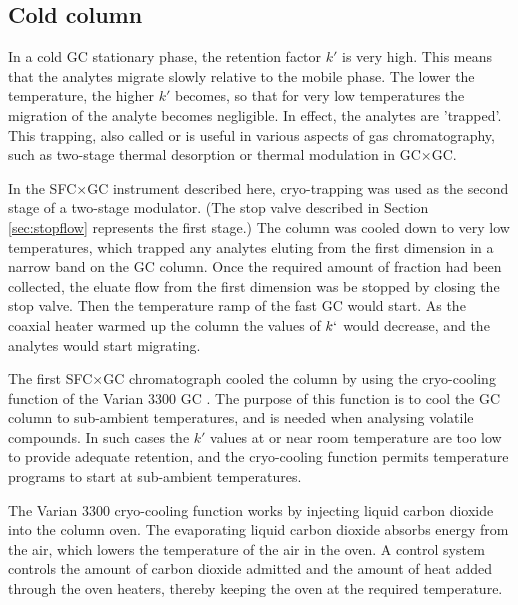 \subsection{Cold column}
\label{sec:ColdColumn}

In a cold GC stationary phase, the retention factor \(k'\) is very high. This
means that the analytes migrate slowly relative to the mobile phase. The lower
the temperature, the higher \(k'\) becomes, so that for very low temperatures
the migration of the analyte becomes negligible. In effect, the analytes are
'trapped'. This trapping, also called  or
 is useful in various aspects of gas chromatography, such
as two-stage thermal desorption or thermal modulation in GC×GC. 


In the SFC×GC instrument described here, cryo-trapping was used as the second
stage of a two-stage modulator. (The stop valve described in Section
\ref{sec:stopflow} represents the first stage.) The column was cooled down to
very low temperatures, which trapped any analytes eluting from the first
dimension in a narrow band on the GC column. Once the required amount of
fraction had been collected, the eluate flow from the first dimension was be
stopped by closing the stop valve. Then the temperature ramp of the fast GC
would start. As the coaxial heater warmed up the column the values of \(k`\)
would decrease, and the analytes would start migrating.

The first SFC×GC chromatograph cooled the column by using the cryo-cooling
function of the Varian 3300 GC \autocite{Venter2004, Venter2003}. The purpose of
this function is to cool the GC column to sub-ambient temperatures, and is
needed when analysing volatile compounds. In such cases the \(k'\) values
at or near room temperature are too low to provide adequate retention, and the
cryo-cooling function permits temperature programs to start at sub-ambient
temperatures.

The Varian 3300 cryo-cooling function works by injecting liquid carbon dioxide
into the column oven. The evaporating liquid carbon dioxide absorbs energy from the
air, which lowers the temperature of the air in the oven. A control system
controls the amount of carbon dioxide admitted and the amount of heat added
through the oven heaters, thereby keeping the oven at the required temperature.

